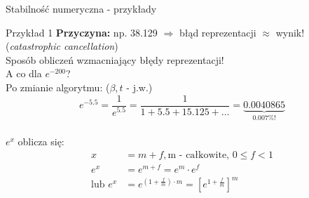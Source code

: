 \begin{frame}{Stabilność numeryczna - przykłady}

	\begin{exampleblock}{Przykład 1}
        {\bf Przyczyna:} np. 38.129 $\Rightarrow$ błąd reprezentacji $\approx$ wynik! ({\it catastrophic cancellation})\\
        Sposób obliczeń wzmacniający błędy reprezentacji!\\
        A co dla $e^{-200}$?\\
        Po zmianie algorytmu: ($\beta, t$ - j.w.)
        \\[-6pt]
        \[
            e^{-5.5} = \frac{1}{e^{5.5}} = \frac{1}{1 + 5.5 + 15.125 + ...} = \underbrace{0.0040865}_\text{0.007\%!}
        \]
        \\[-8pt]
        $e^x$ oblicza się:
        \\[-18pt]
        \begin{align*}
                         x &= m + f, \text{m - całkowite, } 0 \le f < 1 \\
                         e^x &= e^{m+f} = e^m \cdot e^f \\
            \text{lub }  e^x &= e^{(1 + \frac{f}{m}) \cdot m} = \left[ e^{1 + \frac{f}{m}} \right]^m
        \end{align*}
    \end{exampleblock}
\end{frame}
